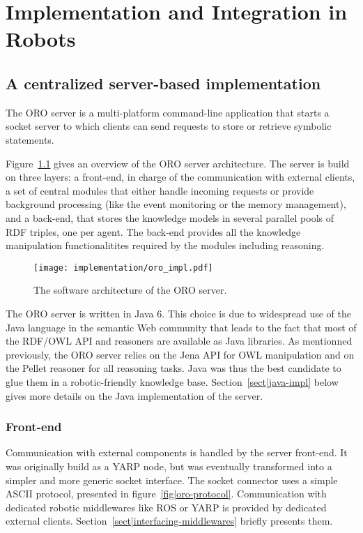 \chapter{Implementation and Integration in Robots}
\label{chapt|implementation-integration}

\section{A centralized server-based implementation}
\label{sect|oro-server-impl}

The ORO server is a multi-platform command-line application that starts a
socket server to which clients can send requests to store or retrieve symbolic
statements.

Figure~\ref{fig|oro-impl} gives an overview of the ORO server architecture. The
server is build on three layers: a front-end, in charge of the communication
with external clients, a set of central modules that either handle incoming
requests or provide background processing (like the event monitoring or the
memory management), and a back-end, that stores the knowledge models in several
parallel pools of RDF triples, one per agent. The back-end provides all the
knowledge manipulation functionalitites required by the modules including
reasoning.

\begin{figure}
    \centering
    \texttt{[image: implementation/oro\_impl.pdf]}
    \caption{The software architecture of the ORO server.}
    \label{fig|oro-impl}
\end{figure}


The ORO server is written in Java 6. This choice is due to widespread use of
the Java language in the semantic Web community that leads to the fact that
most of the RDF/OWL API and reasoners are available as Java libraries. As
mentionned previously, the ORO server relies on the Jena API for OWL
manipulation and on the Pellet reasoner for all reasoning tasks. Java was thus
the best candidate to glue them in a robotic-friendly knowledge base.
Section~\ref{sect|java-impl} below gives more details on the Java
implementation of the server.

\subsection{Front-end}
\label{sect|frontend}

Communication with external components is handled by the server front-end.  It
was originally build as a YARP node, but was eventually transformed into a
simpler and more generic socket interface.  The socket connector uses a simple
ASCII protocol, presented in figure~\ref{fig|oro-protocol}.  Communication with
dedicated robotic middlewares like ROS or YARP is provided by dedicated
external clients. Section~\ref{sect|interfacing-middlewares} briefly presents
them.


